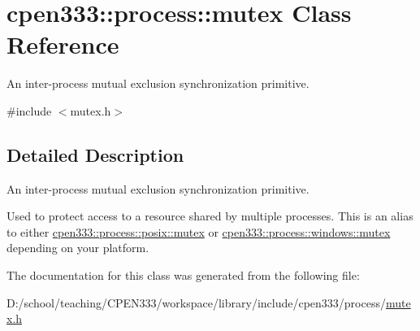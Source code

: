 \hypertarget{classcpen333_1_1process_1_1mutex}{}\section{cpen333\+:\+:process\+:\+:mutex Class Reference}
\label{classcpen333_1_1process_1_1mutex}


An inter-\/process mutual exclusion synchronization primitive.  




{\ttfamily \#include $<$mutex.\+h$>$}



\subsection{Detailed Description}
An inter-\/process mutual exclusion synchronization primitive. 

Used to protect access to a resource shared by multiple processes. This is an alias to either \hyperlink{classcpen333_1_1process_1_1posix_1_1mutex}{cpen333\+::process\+::posix\+::mutex} or \hyperlink{classcpen333_1_1process_1_1windows_1_1mutex}{cpen333\+::process\+::windows\+::mutex} depending on your platform. 

The documentation for this class was generated from the following file\+:\begin{DoxyCompactItemize}
\item 
D\+:/school/teaching/\+C\+P\+E\+N333/workspace/library/include/cpen333/process/\hyperlink{mutex_8h}{mutex.\+h}\end{DoxyCompactItemize}
